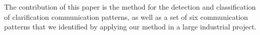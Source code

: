 The contribution of this paper is the method for the detection and classification of clarification communication patterns, as well as a set of six communication patterns that we identified by applying our method in a large industrial project. 





